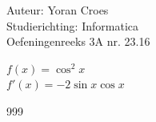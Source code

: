 \documentclass[a4paper]{article}
\begin{document}
\noindent \large Auteur: Yoran Croes \\
\noindent \large Studierichting: Informatica\\
\noindent \large Oefeningenreeks 3A nr. 23.16\\

\medskip

\normalsize

$f(x) = \cos^2 x$ \\

$f'(x) = -2\sin x \cos x$ \\


\begin{thebibliography}{999}
\end{thebibliography}
\end{document}
